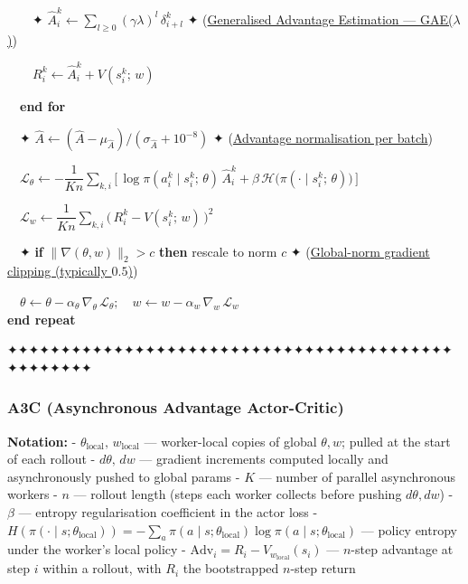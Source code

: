 \documentclass[11pt]{article}
\begin{document}
\begin{pseudobox}
\strut ~~~~✦
\(\hat{A}_i^{k} \leftarrow \sum_{l \geq 0}(\gamma\lambda)^l\, \delta_{i+l}^k\)
✦ (\hyperref[trick-4-3-1]{Generalised Advantage Estimation ---
GAE(\(\lambda\))})\\
\strut ~~~~\(R_i^{k} \leftarrow \hat{A}_i^{k} + V(s_i^{k};\, w)\)\\
\strut ~~\textbf{end for}\\
\strut ~~✦
\(\hat{A} \leftarrow (\hat{A} - \mu_{\hat{A}})/(\sigma_{\hat{A}} + 10^{-8})\)
✦ (\hyperref[trick-4-3-4]{Advantage normalisation per batch})\\
\strut ~~\(\mathcal{L}_\theta \leftarrow -\dfrac{1}{K n} \sum_{k, i} \bigl[\, \log \pi(a_i^{k} \mid s_i^{k};\, \theta)\, \hat{A}_i^{k} + \beta\, \mathcal{H}\bigl(\pi(\cdot \mid s_i^{k};\, \theta)\bigr) \,\bigr]\)\\
\strut ~~\(\mathcal{L}_w \leftarrow \dfrac{1}{K n} \sum_{k, i} \bigl(\, R_i^{k} - V(s_i^{k};\, w) \,\bigr)^{2}\)\\
\strut ~~✦ \textbf{if} \(\lVert\nabla(\theta,w)\rVert_2 > c\)
\textbf{then} rescale to norm \(c\) ✦
(\hyperref[trick-4-3-5]{Global-norm gradient clipping (typically
\(0.5\))})\\
\strut ~~\(\theta \leftarrow \theta - \alpha_\theta\, \nabla_{\theta}\, \mathcal{L}_\theta;\quad w \leftarrow w - \alpha_w\, \nabla_{w}\, \mathcal{L}_w\)\\
\textbf{end repeat}

\end{pseudobox}

    ✦✦✦✦✦✦✦✦✦✦✦✦✦✦✦✦✦✦✦✦✦✦✦✦✦✦✦✦✦✦✦✦✦✦✦✦✦✦✦✦✦✦✦✦✦✦✦✦✦✦

    \clearpage

\label{a3c}

    \subsubsection{A3C (Asynchronous Advantage
Actor-Critic)}\label{a3c-asynchronous-advantage-actor-critic}

    \textbf{Notation:} - \(\theta_\text{local},\, w_\text{local}\) ---
worker-local copies of global \(\theta, w\); pulled at the start of each
rollout - \(d\theta,\, dw\) --- gradient increments computed locally and
asynchronously pushed to global params - \(K\) --- number of parallel
asynchronous workers - \(n\) --- rollout length (steps each worker
collects before pushing \(d\theta, dw\)) - \(\beta\) --- entropy
regularisation coefficient in the actor loss -
\(H(\pi(\cdot\mid s;\theta_\text{local})) = -\sum_a \pi(a\mid s;\theta_\text{local})\log\pi(a\mid s;\theta_\text{local})\)
--- policy entropy under the worker's local policy -
\(\mathrm{Adv}_i = R_i - V_{w_\text{local}}(s_i)\) --- \(n\)-step
advantage at step \(i\) within a rollout, with \(R_i\) the bootstrapped
\(n\)-step return
\end{document}

